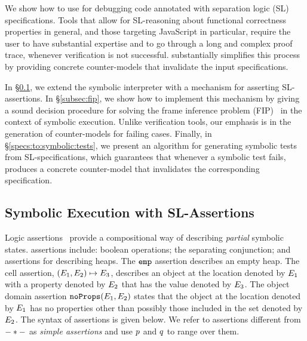 
We show how to use \cosette for debugging \jsil code annotated with 
separation logic (SL) specifications. Tools that allow for SL-reasoning about
functional correctness properties in general, and those targeting 
JavaScript in particular, require the user to have substantial expertise 
and to go through a long and complex proof trace, whenever verification
is not successful. \cosette substantially simplifies this process by providing
concrete counter-models that invalidate the input specifications.

In \S\ref{subsec:sep:assertions}, we extend the 
 \jsil symbolic interpreter with a mechanism for asserting
SL-assertions. 
%
In \S\ref{subsec:fip}, we show how to implement this mechanism by giving 
a sound decision procedure for solving the frame inference problem (FIP)~\cite{}
in the context of symbolic execution.
%
Unlike verification tools, our emphasis is in the generation of counter-models 
for failing cases. 
%
Finally, in \S\ref{specs:to:symbolic:tests}, we present an algorithm  
for generating symbolic tests from SL-specifications, which guarantees 
that whenever a symbolic test fails, \cosette produces a concrete 
counter-model that invalidates the corresponding specification.

\subsection{Symbolic Execution with SL-Assertions}\label{subsec:sep:assertions}

\jsil Logic assertions~\cite{javert}
provide a compositional way of describing \emph{partial} symbolic states. 
\jsil assertions include: boolean operations; the separating conjunction; 
and assertions for describing heaps. The $\texttt{emp}$ assertion describes 
an empty heap. The cell assertion, $(E_1,E_2) \mapsto E_3$,  describes an object 
at the location denoted by $E_1$ with a property denoted by $E_2$ that has the value 
denoted by $E_3$. The object domain assertion $\texttt{noProps}(E_1, E_2)$ states that the object at 
the location denoted by $E_1$ has no properties other than possibly those included in the
set denoted by $E_2$. The syntax of assertions is given below. 
We refer to assertions different from $- \mathbin{*} -$ as \emph{simple assertions}
and use $p$ and $q$ to range over them.

